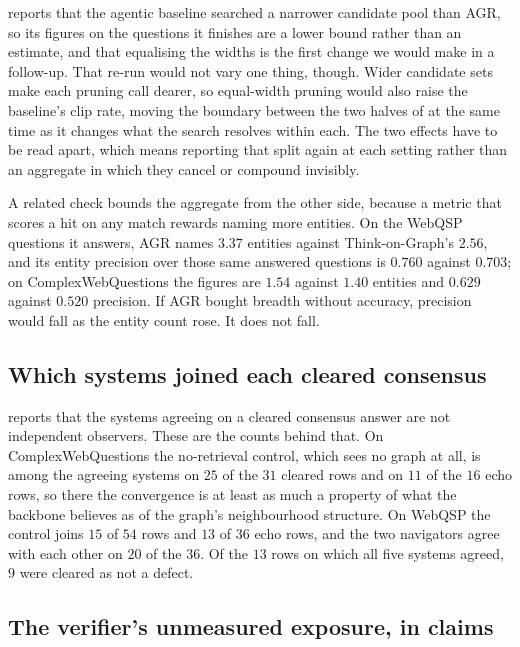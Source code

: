  reports that the agentic baseline searched a narrower
candidate pool than AGR, so its figures on the questions it finishes are
a lower bound rather than an estimate, and that equalising the widths is
the first change we would make in a follow-up. That re-run would not
vary one thing, though. Wider candidate sets make each pruning call
dearer, so equal-width pruning would also raise the baseline's clip
rate, moving the boundary between the two halves of 
at the same time as it changes what the search resolves within each. The
two effects have to be read apart, which means reporting that split
again at each setting rather than an aggregate in which they cancel or
compound invisibly.

A related check bounds the aggregate from the other side, because a
metric that scores a hit on any match rewards naming more entities. On
the WebQSP questions it answers, AGR names $3.37$ entities against
Think-on-Graph's $2.56$, and its entity precision over those same
answered questions is $0.760$ against $0.703$; on ComplexWebQuestions
the figures are $1.54$ against $1.40$ entities and $0.629$ against
$0.520$ precision. If AGR bought breadth without accuracy, precision
would fall as the entity count rose. It does not fall.

\subsection{Which systems joined each cleared
  consensus}\label{app:participation}

 reports that the systems agreeing on a cleared
consensus answer are not independent observers. These are the counts
behind that. On ComplexWebQuestions the no-retrieval control, which sees
no graph at all, is among the agreeing systems on $25$ of the $31$
cleared rows and on $11$ of the $16$ echo rows, so there the convergence
is at least as much a property of what the backbone believes as of the
graph's neighbourhood structure. On WebQSP the control joins $15$ of
$54$ rows and $13$ of $36$ echo rows, and the two navigators agree with
each other on $20$ of the $36$. Of the $13$ rows on which all five
systems agreed, $9$ were cleared as not a defect.

\subsection{The verifier's unmeasured exposure, in
  claims}\label{app:exposure}

